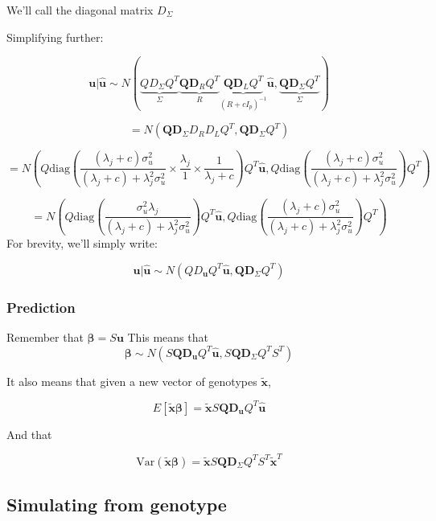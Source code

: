 We'll call the diagonal matrix \(D_\Sigma\)

Simplifying further:

$$\textbf{u}|\hat{\textbf{u}} \sim N(\underbrace{Q D_\Sigma Q^{T}}_\Sigma \underbrace{\textbf{Q}\textbf{D}_{R}Q^{T}}_R \underbrace{\textbf{Q}\textbf{D}_LQ^{T}}_{(R+cI_p)^{-1}}\hat{\textbf{u}},\underbrace{\textbf{Q}\textbf{D}_\Sigma Q^{T}}_\Sigma)$$

$$= N(\textbf{Q}\textbf{D}_\Sigma D_R D_LQ^{T},\textbf{Q}\textbf{D}_\Sigma Q^{T})$$

$$= N\left( Q \text{diag}\left( \frac{(\lambda_j+c)\sigma_u^2}{(\lambda_j+c)+\lambda_j^2\sigma_u^2} \times \frac{\lambda_j}{1} \times \frac{1}{\lambda_j+c} \right)Q^{T}\hat{\textbf{u}},Q \text{diag}\left(\frac{(\lambda_j+c)\sigma_u^2}{(\lambda_j+c)+\lambda_j^2\sigma_u^2} \right)Q^{T} \right)$$

$$= N\left( Q \text{diag}\left( \frac{\sigma_u^2 \lambda_j}{(\lambda_j+c)+\lambda_j^2\sigma_u^2}  \right)Q^{T}\hat{\textbf{u}},Q \text{diag}\left(\frac{(\lambda_j+c)\sigma_u^2}{(\lambda_j+c)+\lambda_j^2\sigma_u^2} \right)Q^{T} \right)$$
For brevity, we'll simply write:

$$\textbf{u}|\hat{\textbf{u}} \sim N \left(Q D_{\textbf{u}}Q^{T}\hat{\textbf{u}},\textbf{Q}\textbf{D}_{\Sigma}Q^{T}\right)$$




\subsubsection{Prediction}\label{sec:org8cfb0b1}

Remember that \(\boldsymbol{\beta}=S\textbf{u}\) This means that 
$$\boldsymbol{\beta} \sim N( S\textbf{Q}\textbf{D}_{\textbf{u}}Q^{T}\hat{\textbf{u}},S\textbf{Q}\textbf{D}_\Sigma Q^{T}S^{T})$$

It also means that given a new vector of genotypes \(\tilde{\textbf{x}}\),

$$E[\tilde{\textbf{x}}\boldsymbol{\beta}]=\tilde{\textbf{x}}S\textbf{Q}\textbf{D}_\textbf{u}Q^{T}\hat{\textbf{u}}$$

And that 

$$\text{Var}(\tilde{\textbf{x}}\boldsymbol{\beta})=\tilde{\textbf{x}}S\textbf{Q}\textbf{D}_\Sigma Q^{T}S^{T}\tilde{\textbf{x}}^{T}$$








\subsection{Simulating from genotype}\label{sec:orgaeeeb37}

